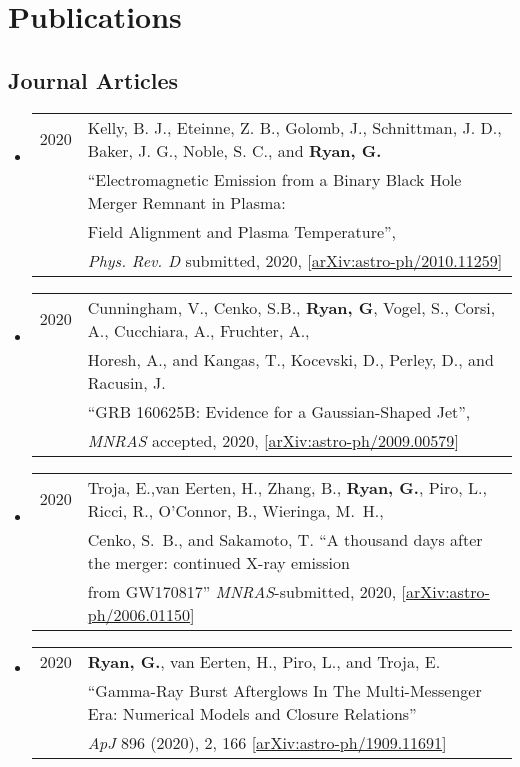 \section*{Publications}
\subsection*{Journal Articles}
\begin{itemize}

\item \begin{tabular}{ll}
2020 & {Kelly}, B. J., {Eteinne}, Z. B., {Golomb}, J.,  {Schnittman}, J. D., {Baker}, J. G., {Noble}, S. C., and {\bf {Ryan}, G.} \\
	& ``Electromagnetic Emission from a Binary Black Hole Merger Remnant in Plasma:\\
	& Field Alignment and Plasma Temperature'',\\
	& \emph{Phys. Rev. D} submitted, 2020, [\href{https://arxiv.org/abs/2010.11259}{arXiv:astro-ph/2010.11259}]
\end{tabular}

\item \begin{tabular}{ll}
2020 & {Cunningham}, V., {Cenko}, S.B., {\bf {Ryan}, G}, {Vogel}, S., {Corsi}, A., {Cucchiara}, A., {Fruchter}, A.,\\
	& {Horesh}, A., and {Kangas}, T., {Kocevski}, D., {Perley}, D., and {Racusin}, J. \\
	& ``GRB 160625B: Evidence for a Gaussian-Shaped Jet'',\\
	& \emph{MNRAS} accepted, 2020, [\href{https://arxiv.org/abs/2009.00579}{arXiv:astro-ph/2009.00579}]
\end{tabular}

\item \begin{tabular}{ll}
2020 & {Troja}, E.,{van Eerten}, H., {Zhang}, B., {\bf {Ryan}, G.}, {Piro}, L., {Ricci}, R., {O'Connor}, B., {Wieringa}, M.~H.,\\
	&  {Cenko}, S.~B., and {Sakamoto}, T.  ``A thousand days after the merger: continued X-ray emission\\
	&  from GW170817''  \emph{MNRAS}-submitted, 2020, [\href{https://arxiv.org/abs/2006.01150}{arXiv:astro-ph/2006.01150}]
\end{tabular}

\item \begin{tabular}{ll}
2020 & {\bf {Ryan}, G.}, {van Eerten}, H., {Piro}, L., and {Troja}, E. \\
	& ``Gamma-Ray Burst Afterglows In The Multi-Messenger Era: Numerical Models and Closure Relations'' \\
	& \emph{ApJ} 896 (2020), 2, 166 [\href{https://arxiv.org/abs/1909.11691}{arXiv:astro-ph/1909.11691}]
\end{tabular}


\end{itemize}
